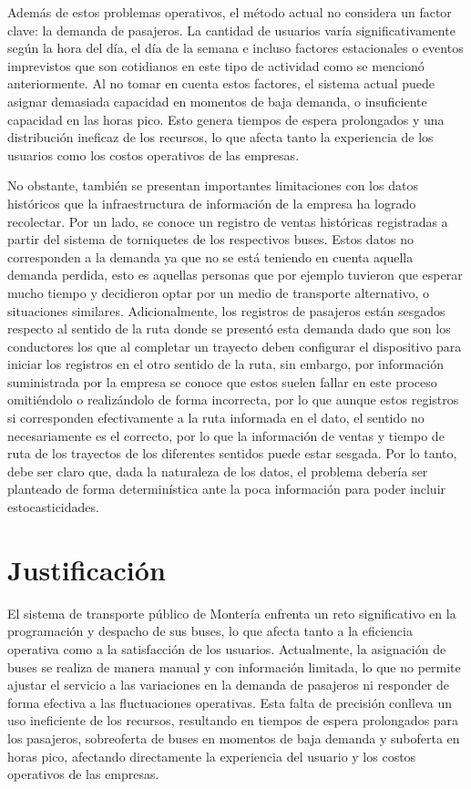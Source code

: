 \documentclass[preprint,11pt]{elsarticle}
\begin{document}
Además de estos problemas operativos, el método actual no considera un factor clave: la demanda de pasajeros. La cantidad de usuarios varía significativamente según la hora del día, el día de la semana e incluso factores estacionales o eventos imprevistos que son cotidianos en este tipo de actividad como se mencionó anteriormente. Al no tomar en cuenta estos factores, el sistema actual puede asignar demasiada capacidad en momentos de baja demanda, o insuficiente capacidad en las horas pico. Esto genera tiempos de espera prolongados y una distribución ineficaz de los recursos, lo que afecta tanto la experiencia de los usuarios como los costos operativos de las empresas.

No obstante, también se presentan importantes limitaciones con los datos históricos que la infraestructura de información de la empresa ha logrado recolectar. Por un lado, se conoce un registro de ventas históricas registradas a partir del sistema de torniquetes de los respectivos buses. Estos datos no corresponden a la demanda ya que no se está teniendo en cuenta aquella demanda perdida, esto es aquellas personas que por ejemplo tuvieron que esperar mucho tiempo y decidieron optar por un medio de transporte alternativo, o situaciones similares. Adicionalmente, los registros de pasajeros están sesgados respecto al sentido de la ruta donde se presentó esta demanda dado que son los conductores los que al completar un trayecto deben configurar el dispositivo para iniciar los registros en el otro sentido de la ruta, sin embargo, por información suministrada por la empresa se conoce que estos suelen fallar en este proceso omitiéndolo o realizándolo de forma incorrecta, por lo que aunque estos registros si corresponden efectivamente a la ruta informada en el dato, el sentido no necesariamente es el correcto, por lo que la información de ventas y tiempo de ruta de los trayectos de los diferentes sentidos puede estar sesgada. Por lo tanto, debe ser claro que, dada la naturaleza de los datos, el problema debería ser planteado de forma determinística ante la poca información para poder incluir estocasticidades.


\section{Justificación}

El sistema de transporte público de Montería enfrenta un reto significativo en la programación y despacho de sus buses, lo que afecta tanto a la eficiencia operativa como a la satisfacción de los usuarios. Actualmente, la asignación de buses se realiza de manera manual y con información limitada, lo que no permite ajustar el servicio a las variaciones en la demanda de pasajeros ni responder de forma efectiva a las fluctuaciones operativas. Esta falta de precisión conlleva un uso ineficiente de los recursos, resultando en tiempos de espera prolongados para los pasajeros, sobreoferta de buses en momentos de baja demanda y suboferta en horas pico, afectando directamente la experiencia del usuario y los costos operativos de las empresas.
\end{document}
